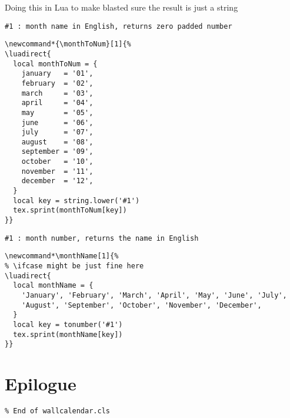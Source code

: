 \documentclass[11pt,oneside]{memoir-article}
\begin{document}
Doing this in Lua to make blasted sure the result is just a string

\begin{verbatim}
#1 : month name in English, returns zero padded number
\end{verbatim}

\begin{verbatim}
\newcommand*{\monthToNum}[1]{%
\luadirect{
  local monthToNum = {
    january   = '01',
    february  = '02',
    march     = '03',
    april     = '04',
    may       = '05',
    june      = '06',
    july      = '07',
    august    = '08',
    september = '09',
    october   = '10',
    november  = '11',
    december  = '12',
  }
  local key = string.lower('#1')
  tex.sprint(monthToNum[key])
}}
\end{verbatim}

\begin{verbatim}
#1 : month number, returns the name in English
\end{verbatim}

\begin{verbatim}
\newcommand*\monthName[1]{%
% \ifcase might be just fine here
\luadirect{
  local monthName = {
    'January', 'February', 'March', 'April', 'May', 'June', 'July',
    'August', 'September', 'October', 'November', 'December',
  }
  local key = tonumber('#1')
  tex.sprint(monthName[key])
}}
\end{verbatim}

\chapter{Epilogue}
\label{sec-14}

\begin{verbatim}
% End of wallcalendar.cls
\end{verbatim}
\end{document}
